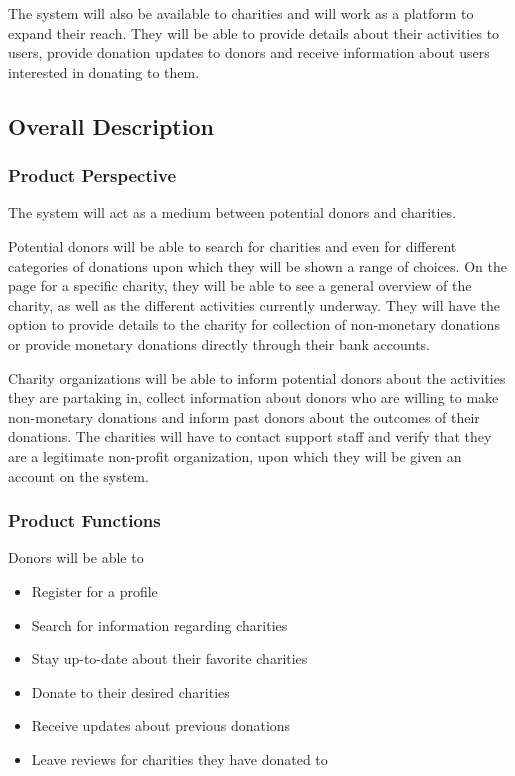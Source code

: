 \documentclass{scrreprt}
\begin{document}
                The system will also be available to charities and will work as a platform to expand their reach. They will be able to provide details about their activities to users, provide donation updates to donors and receive information about users interested in donating to them.
    
        \subsection{Overall Description}
    
            \subsubsection{Product Perspective}
    
                The system will act as a medium between potential donors and charities.\par
    
                Potential donors will be able to search for charities and even for different categories of donations upon which they will be shown a range of choices. On the page for a specific charity, they will be able to see a general overview of the charity, as well as the different activities currently underway. They will have the option to provide details to the charity for collection of non-monetary donations or provide monetary donations directly through their bank accounts.\par
    
                Charity organizations will be able to inform potential donors about the activities they are partaking in, collect information about donors who are willing to make non-monetary donations and inform past donors about the outcomes of their donations. The charities will have to contact support staff and verify that they are a legitimate non-profit organization, upon which they will be given an account on the system.
    
            \subsubsection{Product Functions}
    
                Donors will be able to
    
                \begin{itemize}
                    \item Register for a profile
                    \item Search for information regarding charities
                    \item Stay up-to-date about their favorite charities
                    \item Donate to their desired charities
                    \item Receive updates about previous donations
                    \item Leave reviews for charities they have donated to
                \end{itemize}
    
\end{document}
